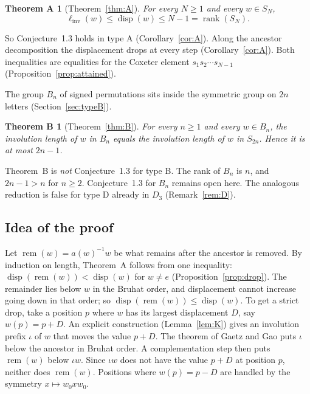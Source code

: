 \documentclass[11pt]{amsart}
\newtheorem*{theoremA}{Theorem A}
\newtheorem*{theoremB}{Theorem B}
\theoremstyle{definition}
\theoremstyle{remark}
\numberwithin{equation}{section}
\newcommand{\linv}{\ell_{\mathrm{inv}}}
\DeclareMathOperator{\rem}{rem}
\DeclareMathOperator{\disp}{disp}
\DeclareMathOperator{\rank}{rank}
\begin{document}
\begin{theoremA}[Theorem~\ref{thm:A}]
For every \(N\ge1\) and every \(w\in S_N\),
\[
\linv(w)\le\disp(w)\le N-1=\rank(S_N).
\]
\end{theoremA}

So Conjecture~1.3 holds in type A (Corollary~\ref{cor:A}). Along the ancestor decomposition the displacement drops at every step (Corollary~\ref{cor:A}). Both inequalities are equalities for the Coxeter element \(s_1s_2\cdots s_{N-1}\) (Proposition~\ref{prop:attained}).

The group \(B_n\) of signed permutations sits inside the symmetric group on \(2n\) letters (Section~\ref{sec:typeB}).

\begin{theoremB}[Theorem~\ref{thm:B}]
For every \(n\ge1\) and every \(w\in B_n\), the involution length of \(w\) in \(B_n\) equals the involution length of \(w\) in \(S_{2n}\). Hence it is at most \(2n-1\).
\end{theoremB}

Theorem~B is \emph{not} Conjecture~1.3 for type B. The rank of \(B_n\) is \(n\), and \(2n-1>n\) for \(n\ge2\). Conjecture~1.3 for \(B_n\) remains open here. The analogous reduction is false for type D already in \(D_3\) (Remark~\ref{rem:D}).

\subsection{Idea of the proof}
Let \(\rem(w)=a(w)^{-1}w\) be what remains after the ancestor is removed. By induction on length, Theorem~A follows from one inequality: \(\disp(\rem(w))<\disp(w)\) for \(w\neq e\) (Proposition~\ref{prop:drop}). The remainder lies below \(w\) in the Bruhat order, and displacement cannot increase going down in that order; so \(\disp(\rem(w))\le\disp(w)\). To get a strict drop, take a position \(p\) where \(w\) has its largest displacement \(D\), say \(w(p)=p+D\). An explicit construction (Lemma~\ref{lem:K}) gives an involution prefix \(\iota\) of \(w\) that moves the value \(p+D\). The theorem of Gaetz and Gao puts \(\iota\) below the ancestor in Bruhat order. A complementation step then puts \(\rem(w)\) below \(\iota w\). Since \(\iota w\) does not have the value \(p+D\) at position \(p\), neither does \(\rem(w)\). Positions where \(w(p)=p-D\) are handled by the symmetry \(x\mapsto w_0xw_0\).
\end{document}
